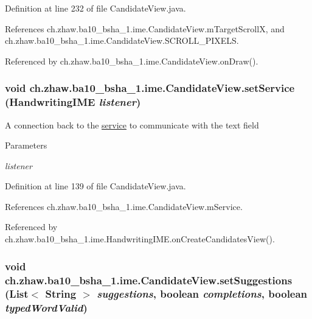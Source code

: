 Definition at line 232 of file CandidateView.java.

References ch.zhaw.ba10\_\-bsha\_\-1.ime.CandidateView.mTargetScrollX, and ch.zhaw.ba10\_\-bsha\_\-1.ime.CandidateView.SCROLL\_\-PIXELS.

Referenced by ch.zhaw.ba10\_\-bsha\_\-1.ime.CandidateView.onDraw().\hypertarget{classch_1_1zhaw_1_1ba10__bsha__1_1_1ime_1_1CandidateView_ae5104c93fe283ac8ea6fa057ce007bc9}{
\subsubsection[{setService}]{\setlength{\rightskip}{0pt plus 5cm}void ch.zhaw.ba10\_\-bsha\_\-1.ime.CandidateView.setService ({\bf HandwritingIME} {\em listener})}}
\label{classch_1_1zhaw_1_1ba10__bsha__1_1_1ime_1_1CandidateView_ae5104c93fe283ac8ea6fa057ce007bc9}
A connection back to the \hyperlink{namespacech_1_1zhaw_1_1ba10__bsha__1_1_1service}{service} to communicate with the text field 
\begin{DoxyParams}{Parameters}
\item[{\em listener}]\end{DoxyParams}


Definition at line 139 of file CandidateView.java.

References ch.zhaw.ba10\_\-bsha\_\-1.ime.CandidateView.mService.

Referenced by ch.zhaw.ba10\_\-bsha\_\-1.ime.HandwritingIME.onCreateCandidatesView().\hypertarget{classch_1_1zhaw_1_1ba10__bsha__1_1_1ime_1_1CandidateView_a3b2b7c5d303e3e6c25dd7458d61b2a20}{
\subsubsection[{setSuggestions}]{\setlength{\rightskip}{0pt plus 5cm}void ch.zhaw.ba10\_\-bsha\_\-1.ime.CandidateView.setSuggestions (List$<$ String $>$ {\em suggestions}, \/  boolean {\em completions}, \/  boolean {\em typedWordValid})}}
\label{classch_1_1zhaw_1_1ba10__bsha__1_1_1ime_1_1CandidateView_a3b2b7c5d303e3e6c25dd7458d61b2a20}


